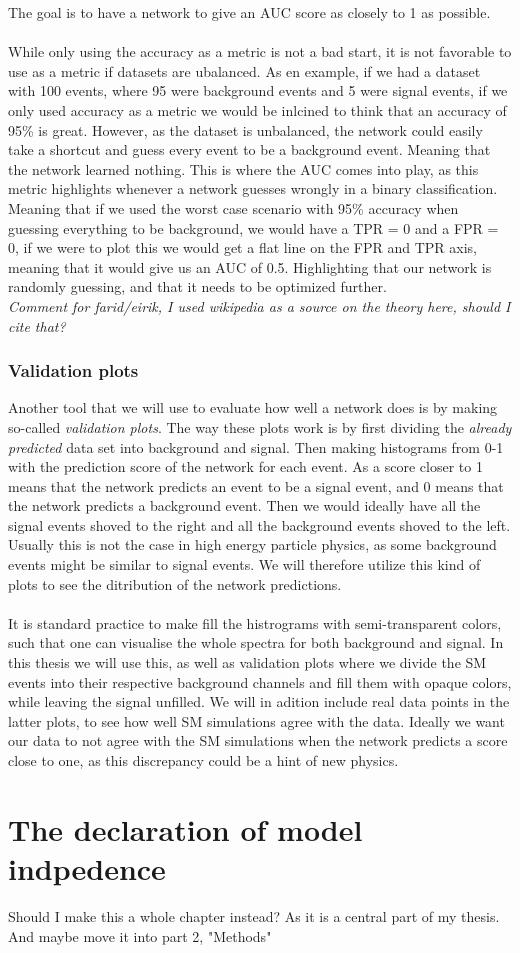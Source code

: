 \documentclass[14pt, a4paper]{book}
\begin{document}
The goal is to have a network to give an AUC score as closely to 1 as possible. \\
\\While only using the accuracy as a metric is not a bad start, it is not favorable to use as a metric if datasets are ubalanced. As en example, if we had a dataset with 100 events, where 95 were background events and 5 were signal events, if we only used accuracy as a metric we would 
be inlcined to think that an accuracy of 95\% is great. However, as the dataset is unbalanced, the network could easily take a shortcut and guess every event to be a background event. Meaning that the network learned nothing.
This is where the AUC comes into play, as this metric highlights whenever a network guesses wrongly in a binary classification. Meaning that if we used the worst case scenario with 95\% accuracy when guessing everything to be background, we would have a TPR = 0 and a FPR = 0, 
if we were to plot this we would get a flat line on the FPR and TPR axis, meaning that it would give us an AUC of 0.5. Highlighting that our network is randomly guessing, and that it needs to be optimized further.\\
\textit{Comment for farid/eirik, I used wikipedia as a source on the theory here, should I cite that?}

\subsubsection{Validation plots}
Another tool that we will use to evaluate how well a network does is by making so-called \textit{validation plots}. The way these plots work is by first dividing the \textit{already predicted} data set into background and signal. Then making histograms from 0-1 
with the prediction score of the network for each event. As a score closer to 1 means that the network predicts an event to be a signal event, and 0 means that the network predicts a background event. Then we would ideally have all the signal events shoved to the right and all the background events shoved to the left. 
Usually this is not the case in high energy particle physics, as some background events might be similar to signal events. We will therefore utilize this kind of plots to see the ditribution of the network predictions. \\
\\It is standard practice to make fill the histrograms with semi-transparent colors, such that one can visualise the whole spectra for both background and signal. In this thesis we will use this, as well as validation plots where we divide the SM events into their respective background channels and fill them with opaque 
colors, while leaving the signal unfilled. We will in adition include real data points in the latter plots, to see how well SM simulations agree with the data. Ideally we want our data to not agree with the SM simulations when the network 
predicts a score close to one, as this discrepancy could be a hint of new physics. 

\section{The declaration of model indpedence}
Should I make this a whole chapter instead? As it is a central part of my thesis. And maybe move it into part 2, "Methods"
\end{document}
